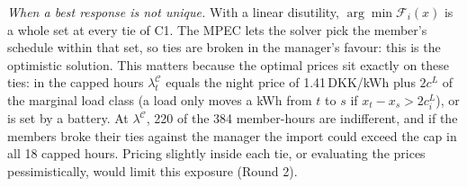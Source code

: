 \documentclass[10pt,a4paper]{article}
\newcommand{\cC}{\mathcal{C}}
\begin{document}
\begin{answer}
\emph{When a best response is not unique.} With a linear disutility, $\arg\min\mathcal F_i(x)$ is a whole set at every tie of C1. The MPEC lets the solver pick the member's schedule within that set, so ties are broken in the manager's favour: this is the optimistic solution. This matters because the optimal prices sit exactly on these ties: in the capped hours $\lambda^{\cC}_t$ equals the night price of 1.41\,DKK/kWh plus $2c^L$ of the marginal load class (a load only moves a kWh from $t$ to $s$ if $x_t-x_s>2c^L_i$), or is set by a battery. At $\lambda^{\cC}$, 220 of the 384 member-hours are indifferent, and if the members broke their ties against the manager the import could exceed the cap in all 18 capped hours. Pricing slightly inside each tie, or evaluating the prices pessimistically, would limit this exposure (Round 2).
\end{answer}
\end{document}
